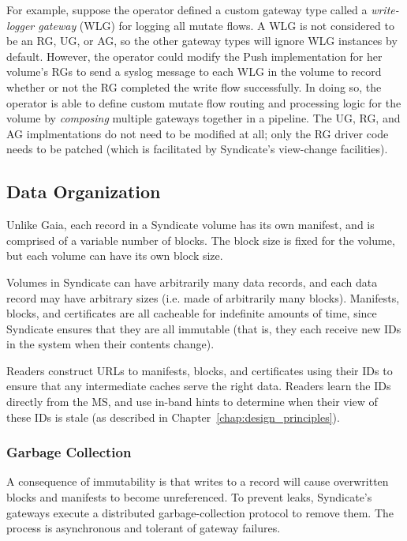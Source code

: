 For example, suppose the operator defined a custom gateway
type called a \emph{write-logger gateway} (WLG) for logging all mutate flows.
A WLG is not considered to be
an RG, UG, or AG, so the other gateway types will ignore WLG instances by
default.  However, the operator could modify the Push implementation for
her volume's RGs to send a syslog message to each WLG in the volume to record
whether or not the RG completed the write flow successfully.  In doing so, the
operator is able to define custom mutate flow routing and processing
logic for the volume by \emph{composing} multiple gateways together in a
pipeline.  The UG, RG, and AG implmentations do not need to be modified at all;
only the RG driver code needs to be patched (which is facilitated by Syndicate's
view-change facilities).

\subsection{Data Organization}

Unlike Gaia, each record in a Syndicate volume has its own manifest, and is
comprised of a variable number of blocks.  The block size is fixed for the
volume, but each volume can have its own block size.

Volumes in Syndicate can have arbitrarily many data records, and each data
record may have arbitrary sizes (i.e. made of arbitrarily many blocks).
Manifests, blocks, and certificates are all cacheable for
indefinite amounts of time, since Syndicate ensures that they are all immutable
(that is, they each receive new IDs in the system when their contents change).

Readers construct URLs to manifests, blocks, and certificates using their IDs to
ensure that any intermediate caches serve the right data.  Readers learn the IDs
directly from the MS, and use in-band hints to determine when their view of
these IDs is stale (as described in Chapter~\ref{chap:design_principles}).

\subsubsection{Garbage Collection}

A consequence of immutability is that writes to a record will cause
overwritten blocks and manifests to become unreferenced.  To prevent leaks, Syndicate's gateways
execute a distributed garbage-collection protocol to remove them.  The process
is asynchronous and tolerant of gateway failures.

